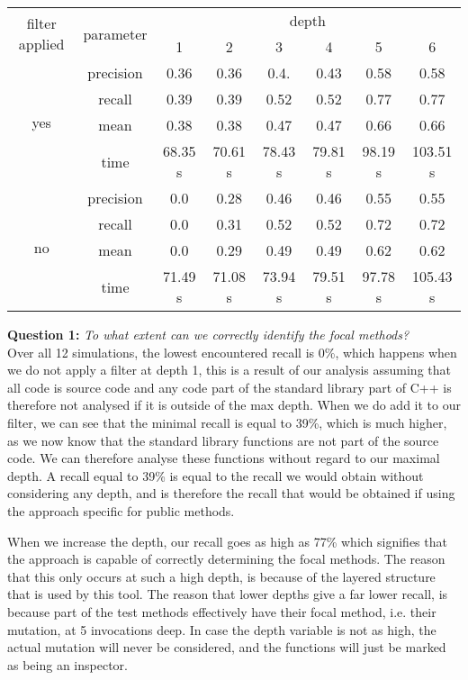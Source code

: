 \documentclass[11pt]{article}
\begin{document}
\begin{multicols}{2}
\begin{table*}[t]
	\centering
	\begin{tabular}{ |c|c|c|c|c|c|c|c|  }
		\hline
		\multirow{2}{*}{filter applied} & \multirow{2}{*}{parameter} & \multicolumn{6}{|c|}{depth} \\
		\cline{3-8}
		& & 1 & 2 & 3 & 4 & 5 & 6\\
		\hline
		\multirow{4}{*}{yes} & precision & 0.36 & 0.36 & 0.4. & 0.43 & 0.58 & 0.58\\
		\cline{2-8}
		& recall & 0.39 & 0.39 & 0.52 & 0.52 & 0.77 & 0.77\\
		\cline{2-8}
		& mean & 0.38 & 0.38 & 0.47 & 0.47 & 0.66 & 0.66\\
		\cline{2-8}
		& time & 68.35 s &  70.61 s & 78.43 s  & 79.81 s & 98.19 s & 103.51 s \\
		\hline
		\multirow{4}{*}{no} & precision & 0.0 & 0.28 & 0.46 & 0.46 & 0.55 & 0.55\\
		\cline{2-8}
		& recall & 0.0 & 0.31 & 0.52 & 0.52 & 0.72 & 0.72\\
		\cline{2-8}
		& mean & 0.0 & 0.29 & 0.49 & 0.49 & 0.62 & 0.62\\
		\cline{2-8}
		& time & 71.49 s &  71.08 s & 73.94 s & 79.51 s & 97.78 s & 105.43 s\\
		\hline
	\end{tabular}
\end{table*}

\noindent
\textbf{Question 1:} \textit{To what extent can we correctly identify the focal methods?}\\
Over all 12 simulations, the lowest encountered recall is 0\%, which happens when we do not apply a filter at depth 1, this is a result of our analysis assuming that all code is source code and any code part of the standard library part of C++ is therefore not analysed if it is outside of the max depth. When we do add it to our filter, we can see that the minimal recall is equal to 39\%, which is much higher, as we now know that the standard library functions are not part of the source code. We can therefore analyse these functions without regard to our maximal depth. A recall equal to 39\% is equal to the recall we would obtain without considering any depth, and is therefore the recall that would be obtained if using the approach specific for public methods.

When we increase the depth, our recall goes as high as 77\% which signifies that the approach is capable of correctly determining the focal methods. The reason that this only occurs at such a high depth, is because of the layered structure that is used by this tool. The reason that lower depths give a far lower recall, is because part of the test methods effectively have their focal method, i.e. their mutation, at 5 invocations deep. In case the depth variable is not as high, the actual mutation will never be considered, and the functions will just be marked as being an inspector.


\end{multicols}
\end{document}
